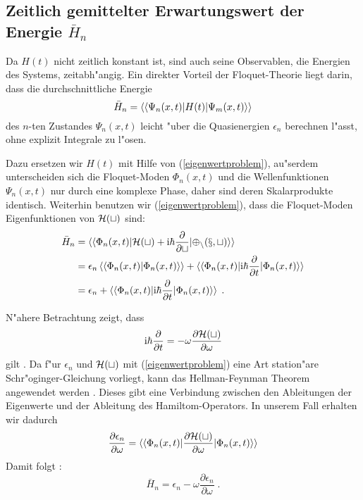   \subsection{\texorpdfstring{Zeitlich gemittelter Erwartungswert der Energie $\bar{H}_n$}{Zeitlich gemittelter Erwartungswert der Energie bar{H}_n}}

    Da $H(t)$ nicht zeitlich konstant ist, sind auch seine Observablen, die Energien des Systems, zeitabh"angig.
    Ein direkter Vorteil der Floquet-Theorie liegt darin, dass die durchschnittliche Energie
    \begin{equation}
      \bar{H}_n  = \braket{\braket{\Psi_n(x,t)|H(t)|\Psi_m(x,t)}}
    \end{equation}
    des $n$-ten Zustandes $\Psi_n(x,t)$ leicht "uber die Quasienergien $\epsilon_n$ berechnen l"asst, ohne explizit Integrale zu l"osen.

    Dazu ersetzen wir $H(t)$ mit Hilfe von (\ref{eigenwertproblem}), au"serdem unterscheiden sich die Floquet-Moden $\Phi_n(x,t)$ und die Wellenfunktionen $\Psi_n(x,t)$ nur durch eine komplexe Phase, daher sind deren Skalarprodukte identisch.
    Weiterhin benutzen wir (\ref{eigenwertproblem}), dass die Floquet-Moden Eigenfunktionen von $\cal{H}(t)$ sind:
    \begin{align}
      \begin{split}
      \bar{H}_n  &= \braket{\braket{\Phi_n(x,t)|\cal{H}(t)+\text{i}\hbar\frac{\partial}{\partial t}|\Phi_n(x,t)}} \\
      &=\epsilon_n \braket{\braket{\Phi_n(x,t)|\Phi_n(x,t)}} + \braket{\braket{\Phi_n(x,t)|\text{i}\hbar\frac{\partial}{\partial t}|\Phi_n(x,t)}} \\
      &= \epsilon_n + \braket{\braket{\Phi_n(x,t)|\text{i}\hbar\frac{\partial}{\partial t}|\Phi_n(x,t)}} \; .
    \end{split}
    \end{align}

    N"ahere Betrachtung zeigt, dass
    \begin{equation}
      \text{i}\hbar\frac{\partial}{\partial t} = -\omega \frac{\partial \cal{H}(t)}{\partial \omega}
    \end{equation}
    gilt \cite{haenggi}.
    Da f"ur $\epsilon_n$ und $\cal H(t)$ mit (\ref{eigenwertproblem}) eine Art station"are Schr"oginger-Gleichung vorliegt, kann das Hellman-Feynman Theorem angewendet werden \cite{hellmann online quelle}.
    Dieses gibt eine Verbindung zwischen den Ableitungen der Eigenwerte und der Ableitung des Hamiltom-Operators.
    In unserem Fall erhalten wir dadurch
    \begin{equation}
      \frac{\partial \epsilon_n}{\partial \omega} = \braket{\braket{\Phi_n(x,t)|\frac{\partial \cal H(t)}{\partial \omega}|\Phi_n(x,t)}}
    \end{equation}
    Damit folgt \cite{haenggi}:
    \begin{equation}
      \bar{H}_n = \epsilon_n - \omega\frac{\partial \epsilon_n}{\partial \omega} \; .
      \label{mittleres_H}
    \end{equation}

